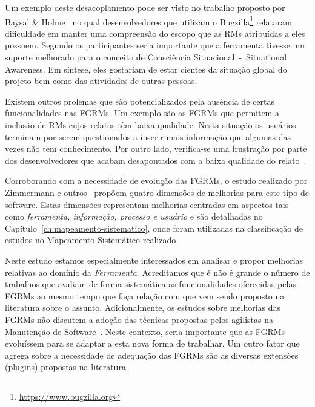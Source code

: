 
Um exemplo deste desacoplamento pode ser visto no trabalho proposto por Baysal
\& Holme~\cite{baysal2012qualitative} no qual desenvolvedores que utilizam o
Bugzilla\footnote{\url{https://www.bugzilla.org}} relataram dificuldade em
manter uma compreensão do escopo que as RMs atribuídas a eles possuem. Segundo
os participantes seria importante que a ferramenta tivesse um suporte melhorado
para o conceito de Consciência Situacional~-~Situational Awareness. Em síntese,
eles gostariam de estar cientes da situação global do projeto bem como das
atividades de outras pessoas.

Existem outros prolemas que são potencializados pela ausência de certas
funcionalidades nas FGRMs. Um exemplo são as FGRMs que permitem a inclusão de
RMs cujos relatos têm baixa qualidade. Nesta situação os usuários terminam por
serem questionados a inserir mais informação que algumas das vezes não tem
conhecimento. Por outro lado, verifica-se uma frustração por parte dos
desenvolvedores que acabam desapontados com a baixa qualidade do
relato~\cite{just2008towards}.

Corroborando com a necessidade de evolução das FGRMs, o estudo realizado por
Zimmermann e outros~\cite{zimmermann2009improving} propõem quatro dimensões de
melhorias para este tipo de software. Estas dimensões representam melhorias
centradas em aspectos tais como \textit{ferramenta, informação, processo e
    usuário} e são detalhadas no Capítulo~\ref{ch:mapeamento-sistematico}, onde
foram utilizadas na classificação de estudos no Mapeamento Sistemático
realizado.


Neste estudo estamos especialmente interessados em analisar e propor melhorias
relativas ao domínio da \textit{Ferramenta}. Acreditamos que é não é grande o
número de trabalhos que avaliam de forma sistemática as funcionalidades
oferecidas pelas FGRMs ao mesmo tempo que faça relação com que vem sendo
proposto na li\-te\-ra\-tu\-ra sobre o assunto. Adicionalmente, os estudos sobre
melhorias das FGRMs não discutem a adoção das técnicas propostas pelos agilistas
na Manutenção de Software~\cite{Soltan2016,Devulapally2015, Heeager2015}. Neste
contexto, seria importante que as FGRMs evoluíssem para se adaptar a esta nova
forma de trabalhar. Um outro fator que agrega sobre a necessidade de adequação
das FGRMs são as diversas extensões (plugins) propostas na literatura
\cite{101186,Thung:2014:BIT:2635868.2661678,Kononenko:2014:DED:2591062.2591075}.

